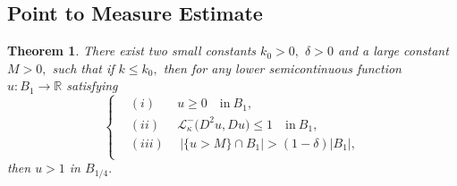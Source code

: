 \documentclass{amsart}
\newtheorem{theorem}{Theorem}[section]
\theoremstyle{plain}
\numberwithin{equation}{section}
\begin{document}
\subsection{Point to Measure Estimate}
\begin{theorem}\label{measure}
There exist two small constants $k_{0}>0,$ $\delta>0$ and a large constant $M>0,$ such that if $k\leq k_{0},$ then for any lower semicontinuous function $u:B_{1}\longrightarrow\mathbb{R}$ satisfying 
\begin{equation}\label{meac}
\left\{
\begin{aligned}
&(i)&~u\geq0 \quad \text{in}~B_1,\\
&(ii)&~\mathcal{L}_{\kappa}^{-}\big(D^{2}u,Du\big)\leq 1\quad \text{in}~B_1,\\ 
&(iii)&~~|\{u>M\}\cap B_{1}|>(1-\delta)|B_{1}|,\\
\end{aligned}
\right.
\end{equation}
then $u>1$ in $B_{1/4}.$
\end{theorem}
\end{document}
